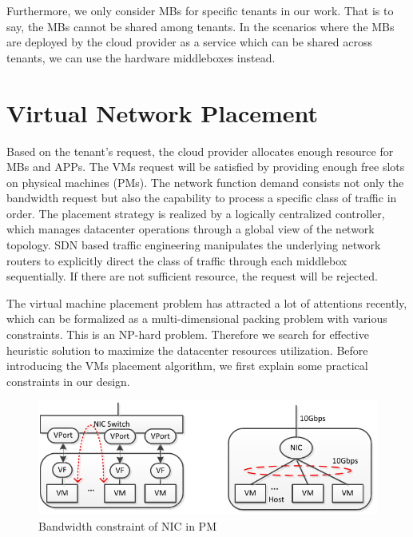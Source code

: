 \documentclass[10pt, conference, letterpaper]{IEEEtran}
\begin{document}
Furthermore, we only consider MBs for specific tenants in our work. That is to say, the MBs cannot be shared among tenants. In the scenarios where the MBs are deployed by the cloud provider as a service which can be shared across tenants, we can use the hardware middleboxes instead.


\section{Virtual Network Placement}\label{sec:algorithm}
Based on the tenant's request, the cloud provider allocates enough resource for MBs and APPs. The VMs request will be satisfied by providing enough free slots on physical machines (PMs). The network function demand consists not only the bandwidth request but also the capability to process a specific class of traffic in order. The placement strategy is realized by a logically centralized controller, which manages datacenter operations through a global view of the network topology. SDN based traffic engineering manipulates the underlying network routers to explicitly direct the class of traffic through each middlebox sequentially. If there are not sufficient resource, the request will be rejected. 


The virtual machine placement problem has attracted a lot of attentions recently, which can be formalized as a multi-dimensional packing problem with various constraints. This is an NP-hard problem\cite{packing, fischer2013virtual}. Therefore we search for effective heuristic solution to maximize the datacenter resources utilization. Before introducing the VMs placement algorithm, we first explain some practical constraints in our design.

\begin{figure}
	\centering
		\includegraphics[width=3.5 in]{fig/nic.pdf}
	\caption{Bandwidth constraint of NIC in PM}
	\label{fig:nic}
\end{figure}
\end{document}

